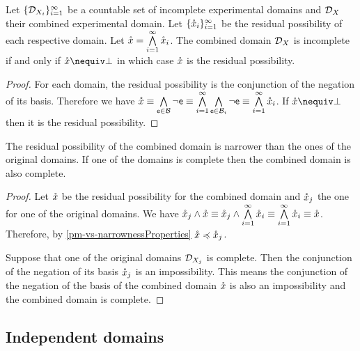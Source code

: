 \begin{mathSection}
	\begin{prop}
		Let $\{\edomain_{X_i}\}_{i=1}^{\infty}$ be a countable set of incomplete experimental domains and $\edomain_X$ their combined experimental domain. Let $\{\resPoss_i\}_{i=1}^{\infty}$ be  the residual possibility of each respective domain. Let $\resPoss = \bigAND\limits_{i=1}^{\infty} \resPoss_i$. The combined domain $\edomain_X$ is incomplete if and only if $\resPoss \nequiv \impossibility$ in which case $\resPoss$ is the residual possibility.
	\end{prop}
	
	\begin{proof}
		For each domain, the residual possibility is the conjunction of the negation of its basis. Therefore we have $\resPoss \equiv \bigAND\limits_{\stmt[e] \in \basis} \NOT \stmt[e] \equiv \bigAND\limits_{i=1}^{\infty} \bigAND\limits_{\stmt[e] \in \basis_i} \NOT \stmt[e] \equiv \bigAND\limits_{i=1}^{\infty} \resPoss_i$. If $\resPoss \nequiv \impossibility$ then it is the residual possibility.
	\end{proof}
	
	\begin{coro}
		The residual possibility of the combined domain is narrower than the ones of the original domains. If one of the domains is complete then the combined domain is also complete.
	\end{coro}
	
	\begin{proof}
		Let $\resPoss$ be the residual possibility for the combined domain and $\resPoss_j$ the one for one of the original domains. We have $\resPoss_j \AND \resPoss \equiv \resPoss_j \AND \bigAND\limits_{i=1}^{\infty} \resPoss_i \equiv \bigAND\limits_{i=1}^{\infty} \resPoss_i \equiv \resPoss$. Therefore, by \ref{pm-vs-narrownessProperties} $\resPoss \narrower \resPoss_j$.
		
		Suppose that one of the original domains $\edomain_{X_j}$ is complete. Then the conjunction of the negation of its basis $\resPoss_j$ is an impossibility. This means the conjunction of the negation of the basis of the combined domain $\resPoss$ is also an impossibility and the combined domain is complete.
	\end{proof}
\end{mathSection}

\subsection{Independent domains}

